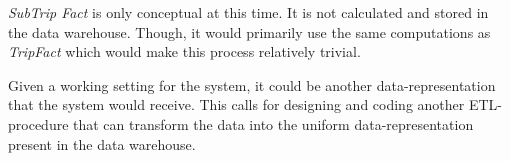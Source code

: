 \textit{SubTrip Fact} is only conceptual at this time. It is not calculated and stored in the data warehouse. Though, it would primarily use the same computations as \textit{TripFact} which would make this process relatively trivial.

Given a working setting for the system, it could be another data-representation that the system would receive. This calls for designing and coding another ETL-procedure that can transform the data into the uniform data-representation present in the data warehouse.

